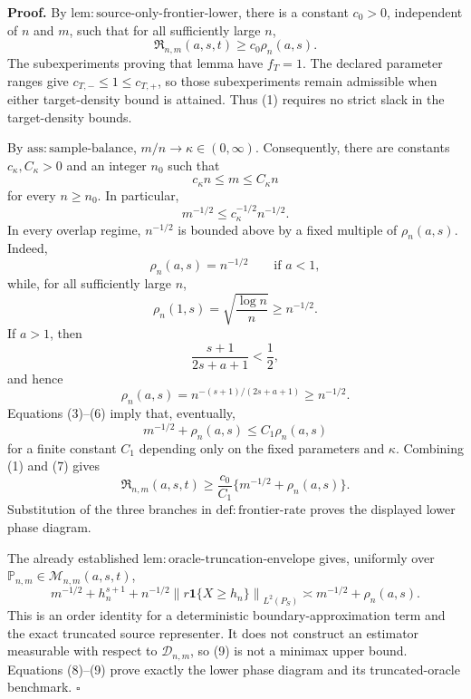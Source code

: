 \textbf{Proof.}
By \(\mathrm{lem:source\text{-}only\text{-}frontier\text{-}lower}\), there is a constant \(c_0>0\), independent of \(n\) and \(m\), such that for all sufficiently large \(n\),
\[
 \mathfrak R_{n,m}(a,s,t)\ge c_0\rho_n(a,s).
\tag{1}
\]
The subexperiments proving that lemma have \(f_T=1\).  The declared parameter ranges give \(c_{T,-}\le 1\le c_{T,+}\), so those subexperiments remain admissible when either target-density bound is attained.  Thus (1) requires no strict slack in the target-density bounds.

By \(\mathrm{ass:sample\text{-}balance}\), \(m/n\to\kappa\in(0,\infty)\).  Consequently, there are constants \(c_\kappa,C_\kappa>0\) and an integer \(n_0\) such that
\[
 c_\kappa n\le m\le C_\kappa n
\tag{2}
\]
for every \(n\ge n_0\).  In particular,
\[
 m^{-1/2}\le c_\kappa^{-1/2}n^{-1/2}.
\tag{3}
\]
In every overlap regime, \(n^{-1/2}\) is bounded above by a fixed multiple of \(\rho_n(a,s)\).  Indeed,
\[
 \rho_n(a,s)=n^{-1/2}\qquad\text{if }a<1,
\tag{4}
\]
while, for all sufficiently large \(n\),
\[
 \rho_n(1,s)=\sqrt{\frac{\log n}{n}}\ge n^{-1/2}.
\tag{5}
\]
If \(a>1\), then
\[
 \frac{s+1}{2s+a+1}<\frac12,
\]
and hence
\[
 \rho_n(a,s)=n^{-(s+1)/(2s+a+1)}\ge n^{-1/2}.
\tag{6}
\]
Equations (3)--(6) imply that, eventually,
\[
 m^{-1/2}+\rho_n(a,s)\le C_1\rho_n(a,s)
\tag{7}
\]
for a finite constant \(C_1\) depending only on the fixed parameters and \(\kappa\).  Combining (1) and (7) gives
\[
 \mathfrak R_{n,m}(a,s,t)
 \ge \frac{c_0}{C_1}\{m^{-1/2}+\rho_n(a,s)\}.
\tag{8}
\]
Substitution of the three branches in \(\mathrm{def:frontier\text{-}rate}\) proves the displayed lower phase diagram.

The already established \(\mathrm{lem:oracle\text{-}truncation\text{-}envelope}\) gives, uniformly over \(\mathbb P_{n,m}\in\mathcal M_{n,m}(a,s,t)\),
\[
 m^{-1/2}+h_n^{s+1}
 +n^{-1/2}\left\|r\mathbf 1\{X\ge h_n\}\right\|_{L^2(P_S)}
 \asymp m^{-1/2}+\rho_n(a,s).
\tag{9}
\]
This is an order identity for a deterministic boundary-approximation term and the exact truncated source representer.  It does not construct an estimator measurable with respect to \(\mathcal D_{n,m}\), so (9) is not a minimax upper bound.  Equations (8)--(9) prove exactly the lower phase diagram and its truncated-oracle benchmark. \(\square\)